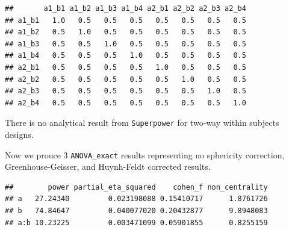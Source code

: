 \documentclass[
]{book}
\newenvironment{Shaded}{\begin{snugshade}}{\end{snugshade}}
\newcommand{\CommentTok}[1]{\textcolor[rgb]{0.56,0.35,0.01}{\textit{#1}}}
\newcommand{\DataTypeTok}[1]{\textcolor[rgb]{0.13,0.29,0.53}{#1}}
\newcommand{\KeywordTok}[1]{\textcolor[rgb]{0.13,0.29,0.53}{\textbf{#1}}}
\newcommand{\NormalTok}[1]{#1}
\newcommand{\OperatorTok}[1]{\textcolor[rgb]{0.81,0.36,0.00}{\textbf{#1}}}
\newcommand{\OtherTok}[1]{\textcolor[rgb]{0.56,0.35,0.01}{#1}}
\newcommand{\StringTok}[1]{\textcolor[rgb]{0.31,0.60,0.02}{#1}}
\begin{document}
\begin{verbatim}
##       a1_b1 a1_b2 a1_b3 a1_b4 a2_b1 a2_b2 a2_b3 a2_b4
## a1_b1   1.0   0.5   0.5   0.5   0.5   0.5   0.5   0.5
## a1_b2   0.5   1.0   0.5   0.5   0.5   0.5   0.5   0.5
## a1_b3   0.5   0.5   1.0   0.5   0.5   0.5   0.5   0.5
## a1_b4   0.5   0.5   0.5   1.0   0.5   0.5   0.5   0.5
## a2_b1   0.5   0.5   0.5   0.5   1.0   0.5   0.5   0.5
## a2_b2   0.5   0.5   0.5   0.5   0.5   1.0   0.5   0.5
## a2_b3   0.5   0.5   0.5   0.5   0.5   0.5   1.0   0.5
## a2_b4   0.5   0.5   0.5   0.5   0.5   0.5   0.5   1.0
\end{verbatim}

There is no analytical result from \texttt{Superpower} for two-way within subjects designs.

Now we prouce 3 \texttt{ANOVA\_exact} results representing no sphericity correction, Greenhouse-Geisser, and Huynh-Feldt corrected results.

\begin{Shaded}
\end{Shaded}

\begin{verbatim}
##        power partial_eta_squared    cohen_f non_centrality
## a   27.24340         0.023198088 0.15410717      1.8761726
## b   74.84647         0.040077020 0.20432877      9.8948083
## a:b 10.23225         0.003471099 0.05901855      0.8255159
\end{verbatim}

\begin{Shaded}
\end{Shaded}
\end{document}
